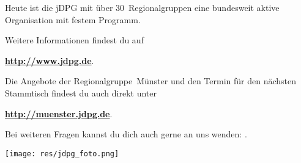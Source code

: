 \begin{multicols}{2}



Heute ist die jDPG mit über 30~Regionalgruppen eine bundesweit aktive Organisation mit festem Programm.

Weitere Informationen findest du auf
\begin{center}
    \textbf{\url{http://www.jdpg.de}}.
\end{center}

Die Angebote der Regionalgruppe~Münster und den Termin für den nächsten Stammtisch findest du auch direkt unter
\begin{center}
    \textbf{\url{http://muenster.jdpg.de}}.
\end{center}

Bei weiteren Fragen kannst du dich auch gerne an uns wenden:
\textbf{}.


\begin{center}
    \texttt{[image: res/jdpg\_foto.png]}
\end{center}

\end{multicols}

\begin{center}
\end{center}
